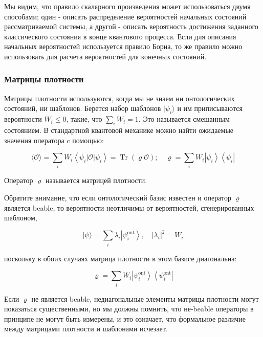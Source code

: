 \documentclass[main.tex]{subfiles}
\begin{document}
Мы видим, что правило скалярного произведения может использоваться двумя способами; один - описать распределение вероятностей начальных состояний рассматриваемой системы, а другой - описать вероятность достижения заданного классического состояния в конце квантового процесса. Если для описания начальных вероятностей используется правило Борна, то же правило можно использовать для расчета вероятностей для конечных состояний.

\subsubsection{Матрицы плотности}\label{ch5.5.4}

Матрицы плотности используются, когда мы не знаем ни онтологических состояний, ни шаблонов. Берется набор шаблонов $\mid \psi_i \rangle$ и им приписываются  вероятности $W_i \le 0$, такие, что $\sum_i W_i = 1$. Это называется смешанным состоянием. В стандартной квантовой механике можно найти ожидаемые значения оператора c помощью:

\begin{equation}\label{5.16}
	\langle\mathcal{O}\rangle=\sum_{i} W_{i}\left\langle\psi_{i}|\mathcal{O}| \psi_{i}\right\rangle=\operatorname{Tr}(\varrho \mathcal{O}) ; \quad \varrho=\sum_{i} W_{i}\left|\psi_{i}\right\rangle\left\langle\psi_{i}\right|
\end{equation}

Оператор $\varrho$ называется матрицей плотности.

Обратите внимание, что если онтологический базис известен и оператор $\varrho$ является beable, то вероятности неотличимы от вероятностей, сгенерированных шаблоном,


\begin{equation}\label{5.17}
	|\psi\rangle=\sum_{i} \lambda_{i}\left|\psi_{i}^{\mathrm{ont}}\right\rangle, \quad\left|\lambda_{i}\right|^{2}=W_{i}
\end{equation}

поскольку в обоих случаях матрица плотности в этом базисе диагональна:

\begin{equation}\label{5.18}
	\varrho=\sum_{i} W_{i}\left|\psi_{i}^{\mathrm{ont}}\right\rangle\left\langle\psi_{i}^{\mathrm{ont}}\right|
\end{equation}

Если $\varrho$ не является beable, недиагональные элементы матрицы плотности могут показаться существенными, но мы должны помнить, что не-beable операторы в принципе не могут быть измерены, и это означает, что формальное различие между матрицами плотности и шаблонами исчезает.
\end{document}
